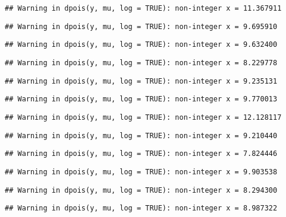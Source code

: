 \documentclass[
]{article}
\begin{document}
\begin{verbatim}
## Warning in dpois(y, mu, log = TRUE): non-integer x = 11.367911
\end{verbatim}

\begin{verbatim}
## Warning in dpois(y, mu, log = TRUE): non-integer x = 9.695910
\end{verbatim}

\begin{verbatim}
## Warning in dpois(y, mu, log = TRUE): non-integer x = 9.632400
\end{verbatim}

\begin{verbatim}
## Warning in dpois(y, mu, log = TRUE): non-integer x = 8.229778
\end{verbatim}

\begin{verbatim}
## Warning in dpois(y, mu, log = TRUE): non-integer x = 9.235131
\end{verbatim}

\begin{verbatim}
## Warning in dpois(y, mu, log = TRUE): non-integer x = 9.770013
\end{verbatim}

\begin{verbatim}
## Warning in dpois(y, mu, log = TRUE): non-integer x = 12.128117
\end{verbatim}

\begin{verbatim}
## Warning in dpois(y, mu, log = TRUE): non-integer x = 9.210440
\end{verbatim}

\begin{verbatim}
## Warning in dpois(y, mu, log = TRUE): non-integer x = 7.824446
\end{verbatim}

\begin{verbatim}
## Warning in dpois(y, mu, log = TRUE): non-integer x = 9.903538
\end{verbatim}

\begin{verbatim}
## Warning in dpois(y, mu, log = TRUE): non-integer x = 8.294300
\end{verbatim}

\begin{verbatim}
## Warning in dpois(y, mu, log = TRUE): non-integer x = 8.987322
\end{verbatim}
\end{document}
